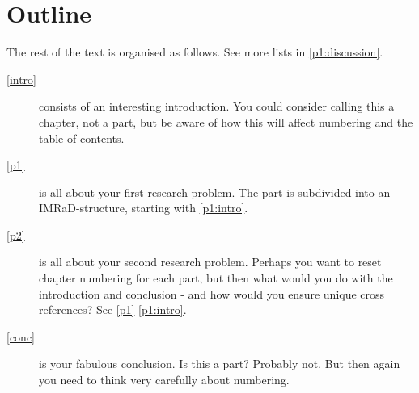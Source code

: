 \section{Outline}

The rest of the text is organised as follows. See more lists in \cref{p1:discussion}.
\begin{description}
    \item[\cref{intro}] consists of an interesting introduction. You could consider calling this a chapter, not a part, but be aware of how this will affect numbering and the table of contents.
    \item[\cref{p1}] is all about your first research problem. The part is subdivided into an IMRaD-structure, starting with \cref{p1:intro}. 
    \item[\cref{p2}] is all about your second research problem. Perhaps you want to reset chapter numbering for each part, but then what would you do with the introduction and conclusion - and how would you ensure unique cross references? See \cref{p1} \cref{p1:intro}.
    \item[\cref{conc}] is your fabulous conclusion. Is this a part? Probably not. But then again you need to think very carefully about numbering.
\end{description}
